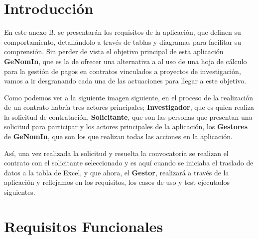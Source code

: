 \section{Introducción}
En este anexo B, se presentarán los requisitos de la aplicación, que definen su comportamiento, detallándolo a través de tablas y diagramas para facilitar su comprensión.
Sin perder de vista el objetivo principal de esta aplicación  \textbf{GeNomIn}, que es la de ofrecer una alternativa a al uso de una hoja de cálculo para la gestión de pagos en contratos vinculados a proyectos de investigación, vamos a ir desgranando cada una de las actuaciones para llegar a este objetivo.

Como podemos ver a la siguiente imagen siguiente, en el proceso de la realización de un contrato habría tres actores principales; \textbf{Investigador}, que es quien realiza la solicitud de contratación, \textbf{Solicitante}, que son las personas que presentan una solicitud para participar y los actores principales de la aplicación, los \textbf{Gestores} de \textbf{GeNomIn}, que son los que realizan todas las acciones en la aplicación.

Así, una vez realizada la solicitud y resuelta la convocatoria se realizan el contrato con el solicitante seleccionado y es aquí cuando se iniciaba el traslado de datos a la tabla de Excel, y que ahora, el \textbf{Gestor}, realizará a través de la aplicación y reflejamos en los requisitos, los casos de uso y test ejecutados siguientes.
\section{Requisitos Funcionales}

